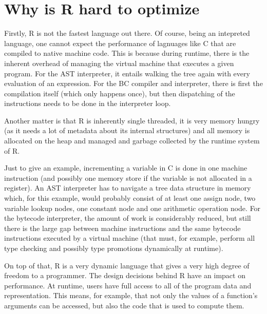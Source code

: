 {%

\section{Why is R hard to optimize}

\todo \autocite{inferno} \autocite{design} \autocite{hadley}

Firstly, R is not the fastest language out there. Of course, being an intepreted language, one cannot expect the performance of lagnuages like C that are compiled to native machine code. This is because during runtime, there is the inherent overhead of managing the virtual machine that executes a given program. For the AST interpreter, it entails walking the tree again with every evaluation of an expression. For the BC compiler and interpreter, there is first the compilation itself (which only happens once), but then dispatching of the instructions needs to be done in the interpreter loop.

Another matter is that R is inherently single threaded, it is very memory hungry (as it needs a lot of metadata about its internal structures) and all memory is allocated on the heap and managed and garbage collected by the runtime system of R.

Just to give an example, incrementing a variable in C is done in one machine instruction (and possibly one memory store if the variable is not allocated in a register). An AST interpreter has to navigate a tree data structure in memory which, for this example, would probably consist of at least one assign node, two variable lookup nodes, one constant node and one arithmetic operation node. For the bytecode interpreter, the amount of work is considerably reduced, but still there is the large gap between machine instructions and the same bytecode instructions executed by a virtual machine (that must, for example, perform all type checking and possibly type promotions dynamically at runtime).

On top of that, R is a very dynamic language that gives a very high degree of freedom to a programmer. The design decisions behind R have an impact on performance. At runtime, users have full access to all of the program data and representation. This means, for example, that not only the values of a function's arguments can be accessed, but also the code that is used to compute them.

}
